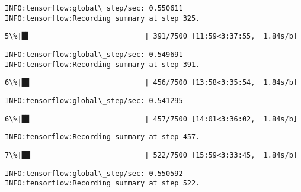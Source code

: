 \documentclass[11pt]{article}
\begin{document}
    \begin{Verbatim}[commandchars=\\\{\}]
INFO:tensorflow:global\_step/sec: 0.550611
INFO:tensorflow:Recording summary at step 325.

    \end{Verbatim}

    \begin{Verbatim}[commandchars=\\\{\}]
  5\%|█▌                           | 391/7500 [11:59<3:37:55,  1.84s/b]
    \end{Verbatim}

    \begin{Verbatim}[commandchars=\\\{\}]
INFO:tensorflow:global\_step/sec: 0.549691
INFO:tensorflow:Recording summary at step 391.

    \end{Verbatim}

    \begin{Verbatim}[commandchars=\\\{\}]
  6\%|█▊                           | 456/7500 [13:58<3:35:54,  1.84s/b]
    \end{Verbatim}

    \begin{Verbatim}[commandchars=\\\{\}]
INFO:tensorflow:global\_step/sec: 0.541295

    \end{Verbatim}

    \begin{Verbatim}[commandchars=\\\{\}]
  6\%|█▊                           | 457/7500 [14:01<3:36:02,  1.84s/b]
    \end{Verbatim}

    \begin{Verbatim}[commandchars=\\\{\}]
INFO:tensorflow:Recording summary at step 457.

    \end{Verbatim}

    \begin{Verbatim}[commandchars=\\\{\}]
  7\%|██                           | 522/7500 [15:59<3:33:45,  1.84s/b]
    \end{Verbatim}

    \begin{Verbatim}[commandchars=\\\{\}]
INFO:tensorflow:global\_step/sec: 0.550592
INFO:tensorflow:Recording summary at step 522.

    \end{Verbatim}
\end{document}
